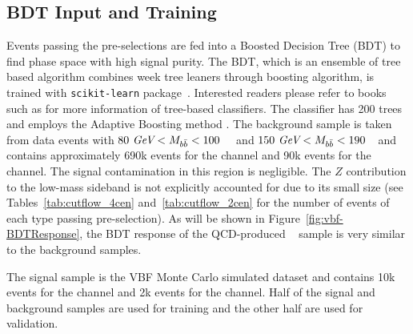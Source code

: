 \label{sec:vbf-bdt}

\subsection{BDT Input and Training}
Events passing the pre-selections are fed into a Boosted Decision Tree (BDT) to find phase space with high signal purity.
The BDT, which is an ensemble of tree based algorithm combines week tree leaners through boosting algorithm, is trained with \texttt{scikit-learn} package~\cite{scikit-learn}. Interested readers please refer to books such as \cite{BDTBOOK} for more information of tree-based classifiers.
The classifier has 200 trees and employs the Adaptive Boosting method \cite{adaboost}.
The background sample is taken from data events with $80~\textit{GeV} < M_{b\bar{b}} <100$~\GeV~
and $150~\textit{GeV}<M_{b\bar{b}}<190$~\GeV~and contains approximately 690k events for
the \fourcentral channel and 90k events for the \twocentral channel.
The signal contamination in this region is negligible.
The $Z$ contribution to the low-mass sideband is not explicitly accounted
for due to its small size (see Tables~\ref{tab:cutflow_4cen}
and~\ref{tab:cutflow_2cen} for the number of events of each type passing pre-selection).
As will be shown in Figure~\ref{fig:vbf-BDTResponse},
the BDT response of the QCD-produced \zjets~ sample is very similar to the background samples. 

The signal sample is the VBF Monte Carlo simulated dataset and
contains 10k events for the \fourcentral channel and 2k events for
the \twocentral channel.  Half of the signal and background samples are
used for training and the other half are used for validation.

